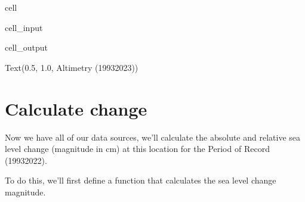\documentclass[letterpaper,10pt,english]{jupyterBook}
\begin{document}
\begin{sphinxuseclass}{cell}
\begin{sphinxVerbatimInput}
\begin{sphinxuseclass}{cell_input}
\begin{sphinxVerbatim}[commandchars=\\\{\}]
\PYG{p}{[} \PYG{p}{]}

\end{sphinxVerbatim}

\end{sphinxuseclass}\end{sphinxVerbatimInput}
\begin{sphinxVerbatimOutput}

\begin{sphinxuseclass}{cell_output}
\begin{sphinxVerbatim}[commandchars=\\\{\}]
Text(0.5, 1.0, \PYGZsq{}Altimetry (1993\PYGZhy{}2023)\PYGZsq{})
\end{sphinxVerbatim}

\noindent{}

\end{sphinxuseclass}\end{sphinxVerbatimOutput}

\end{sphinxuseclass}

\section{Calculate change}
\label{\detokenize{notebooks/regional_and_local/SL_Trend:calculate-change}}
\sphinxAtStartPar
Now we have all of our data sources, we’ll calculate the absolute and relative sea level change (magnitude in cm) at this location for the Period of Record (1993\sphinxhyphen{}2022).

\sphinxAtStartPar
To do this, we’ll first define a function that calculates the sea level change magnitude.
\end{document}
